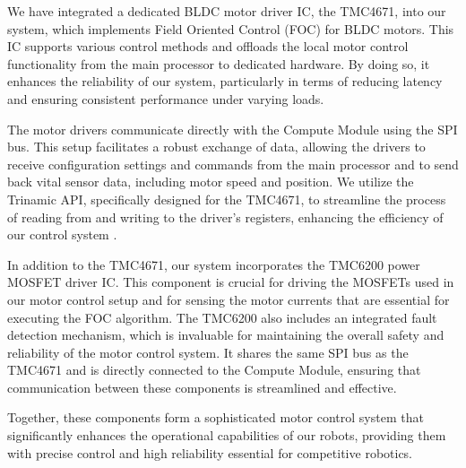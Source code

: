 \documentclass[runningheads]{llncs}
\begin{document}
We have integrated a dedicated BLDC motor driver IC, the TMC4671, into our system, which implements Field Oriented Control (FOC) for BLDC motors. This IC supports various control methods and offloads the local motor control functionality from the main processor to dedicated hardware. By doing so, it enhances the reliability of our system, particularly in terms of reducing latency and ensuring consistent performance under varying loads.

The motor drivers communicate directly with the Compute Module using the SPI bus. This setup facilitates a robust exchange of data, allowing the drivers to receive configuration settings and commands from the main processor and to send back vital sensor data, including motor speed and position. We utilize the Trinamic API, specifically designed for the TMC4671, to streamline the process of reading from and writing to the driver's registers, enhancing the efficiency of our control system \cite{ref_TMC_API}.

In addition to the TMC4671, our system incorporates the TMC6200 power MOSFET driver IC. This component is crucial for driving the MOSFETs used in our motor control setup and for sensing the motor currents that are essential for executing the FOC algorithm. The TMC6200 also includes an integrated fault detection mechanism, which is invaluable for maintaining the overall safety and reliability of the motor control system. It shares the same SPI bus as the TMC4671 and is directly connected to the Compute Module, ensuring that communication between these components is streamlined and effective.

Together, these components form a sophisticated motor control system that significantly enhances the operational capabilities of our robots, providing them with precise control and high reliability essential for competitive robotics.
\end{document}
